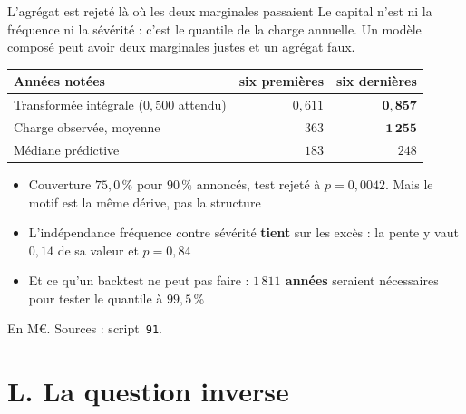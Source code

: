 \documentclass[11pt]{beamer}
\begin{document}
\begin{frame}{L'agrégat est rejeté là où les deux marginales passaient}
\small
Le capital n'est ni la fréquence ni la sévérité : c'est le quantile de la charge annuelle. Un
modèle composé peut avoir deux marginales justes et un agrégat faux.
\vspace{1mm}

\begin{center}\small
\begin{tabular}{@{}l r r@{}}
\toprule
\textbf{Années notées} & \textbf{six premières} & \textbf{six dernières} \\
\midrule
Transformée intégrale ($0{,}500$ attendu) & $0{,}611$ & $\mathbf{0{,}857}$ \\
Charge observée, moyenne & $363$ & $\mathbf{1\,255}$ \\
Médiane prédictive & $183$ & $248$ \\
\bottomrule
\end{tabular}
\end{center}
\vspace{2mm}

\begin{itemize}\itemsep4pt
  \item Couverture $75{,}0\,\%$ pour $90\,\%$ annoncés, test rejeté à $p = 0{,}0042$.
        \alert{Mais le motif est la même dérive, pas la structure}
  \item L'indépendance fréquence contre sévérité \textbf{tient} sur les excès : la pente y vaut
        $0{,}14$ de sa valeur et $p = 0{,}84$
  \item Et ce qu'un backtest ne peut pas faire : \textbf{$1\,811$ années} seraient nécessaires
        pour tester le quantile à $99{,}5\,\%$
\end{itemize}
\vspace{1mm}
{\scriptsize En M\euro. Sources : script~\texttt{91}.}
\end{frame}

\section*{L. La question inverse}
\end{document}
